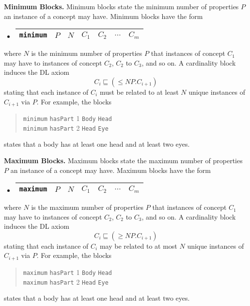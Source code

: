 \documentclass[preprint,number]{elsarticle}
\newcommand{\myblock}[1]{\vspace{12pt}\noindent\textbf{#1}}
\begin{document}
\myblock{Minimum Blocks.} Minimum blocks state the minimum number of
properties $P$ an instance of a concept may have.  Minimum blocks have
the form
\begin{itemize}
\item[]
  \begin{tabular}{|l|l|l|l|l|l|l|}\hline \texttt{minimum} & $P$ & $N$ & 
    $C_1$ & $C_2$ & $\dots$ & $C_m$
    \\ \hline
  \end{tabular}
\end{itemize}
where $N$ is the minimum number of properties $P$ that instances of
concept $C_1$ may have to instances of concept $C_2$, $C_2$ to $C_3$,
and so on. A cardinality block induces the DL axiom \[C_i \sqsubseteq
(\le N P.C_{i+1})\] stating that each instance of $C_i$ must be related to
at least $N$ unique instances of $C_{i+1}$ via $P$. For example, the blocks
\begin{quote}
\texttt{minimum} \texttt{hasPart} 1 \texttt{Body} \texttt{Head} \\
\texttt{minimum} \texttt{hasPart} 2 \texttt{Head} \texttt{Eye}
\end{quote}
states that a body has at least one head and at least two eyes.


\myblock{Maximum Blocks.} Maximum blocks state the maximum
number of properties $P$ an instance of a concept may have.
Maximum blocks have the form
\begin{itemize}
\item[]
  \begin{tabular}{|l|l|l|l|l|l|l|}\hline \texttt{maximum} & $P$ & $N$ & 
    $C_1$ & $C_2$ & $\dots$ & $C_m$
    \\ \hline
  \end{tabular}
\end{itemize}
where $N$ is the maximum number of properties $P$ that instances of
concept $C_1$ may have to instances of concept $C_2$, $C_2$ to $C_3$,
and so on. A cardinality block induces the DL axiom \[C_i \sqsubseteq
(\ge N P.C_{i+1})\] stating that each instance of $C_i$ may be related to
at most $N$ unique instances of $C_{i+1}$ via $P$. For example, the blocks
\begin{quote}
\texttt{maximum} \texttt{hasPart} 1 \texttt{Body} \texttt{Head} \\
\texttt{maximum} \texttt{hasPart} 2 \texttt{Head} \texttt{Eye}
\end{quote}
states that a body has at least one head and at least two eyes.
\end{document}
